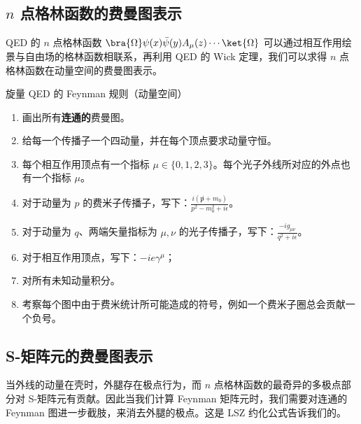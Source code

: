 
\subsection{$n$ 点格林函数的费曼图表示}
QED 的 $n$ 点格林函数 $\bra{\Omega} \psi(x)\bar\psi(y)A_\mu(z) \cdots \ket{\Omega}$ 可以通过相互作用绘景与自由场的格林函数相联系，再利用 QED 的 Wick 定理，我们可以求得 $n$ 点格林函数在动量空间的费曼图表示。
\begin{theorem}{旋量 QED 的 Feynman 规则（动量空间）}\label{the_qedfey_1}

\begin{enumerate}
\item 画出所有\textbf{连通的}费曼图。
\item 给每一个传播子一个四动量，并在每个顶点要求动量守恒。
\item 每个相互作用顶点有一个指标 $\mu\in\{0,1,2,3\}$。每个光子外线所对应的外点也有一个指标 $\mu$。
\item 对于动量为 $p$ 的费米子传播子，写下：$\frac{i(\not p+m_0)}{p^2-m_0^2 + i\epsilon}$。
\item 对于动量为 $q$、两端矢量指标为 $\mu,\nu$ 的光子传播子，写下：$\frac{-ig_{\mu\nu}}{q^2 + i\epsilon}$。
\item 对于相互作用顶点，写下：$-ie\gamma^\mu$；
\item 
对所有未知动量积分。
\item 
考察每个图中由于费米统计所可能造成的符号，例如一个费米子圈总会贡献一个负号。
\end{enumerate}
\end{theorem}

\subsection{S-矩阵元的费曼图表示}

当外线的动量在壳时，外腿存在极点行为，而 $n$ 点格林函数的最奇异的多极点部分对 S-矩阵元有贡献。因此当我们计算 Feynman 矩阵元时，我们需要对连通的 Feynman 图进一步截肢，来消去外腿的极点。这是 LSZ 约化公式告诉我们的。

